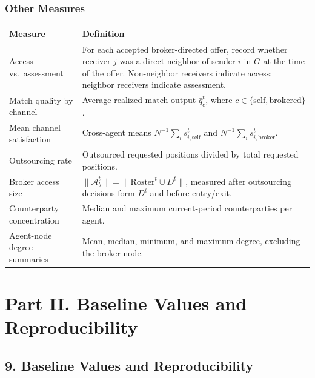 \documentclass[11pt]{article}
\begin{document}
\subsubsection{Other Measures}\label{other-measures}

{
\begin{longtable}[]{@{}
  >{\raggedright\arraybackslash}p{}
  >{\raggedright\arraybackslash}p{}@{}}
\toprule\noalign{}
\begin{minipage}[b]{\linewidth}\raggedright
Measure
\end{minipage} & \begin{minipage}[b]{\linewidth}\raggedright
Definition
\end{minipage} \\
\midrule\noalign{}
\endhead
\bottomrule\noalign{}
\endlastfoot
Access vs.~assessment & For each accepted broker-directed offer, record whether receiver \(j\) was a direct neighbor of sender \(i\) in \(G\) at the time of the offer. Non-neighbor receivers indicate access; neighbor receivers indicate assessment. \\
Match quality by channel & Average realized match output \(\bar{q}_c^t\), where \(c \in \{\text{self}, \text{brokered}\}\). \\
Mean channel satisfaction & Cross-agent means \(N^{-1}\sum_i s_{i,\text{self}}^t\) and \(N^{-1}\sum_i s_{i,\text{broker}}^t\). \\
Outsourcing rate & Outsourced requested positions divided by total requested positions. \\
Broker access size & \(\|\mathcal{A}_b^t\| = \|\text{Roster}^t \cup D^t\|\), measured after outsourcing decisions form \(D^t\) and before entry/exit. \\
Counterparty concentration & Median and maximum current-period counterparties per agent. \\
Agent-node degree summaries & Mean, median, minimum, and maximum degree, excluding the broker node. \\
\end{longtable}
}

\section{Part II. Baseline Values and Reproducibility}\label{part-ii.-baseline-values-and-reproducibility}

\subsection{9. Baseline Values and Reproducibility}\label{baseline-values-and-reproducibility}
\end{document}

